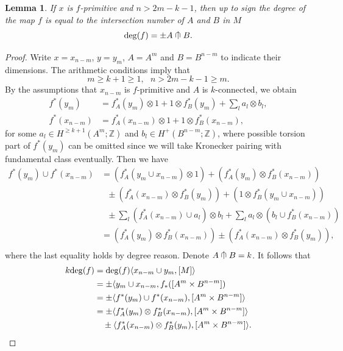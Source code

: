 \documentclass[a4]{amsart}
\newtheorem{lemma}[theorem]{Lemma}
\theoremstyle{definition}
\newcommand{\testcap}{\mathrel{\vcenter{\offinterlineskip
\hbox{$\cap$}\vskip-1.8ex\hbox{$\kern0.2em | \kern0.15em$}}}}
\begin{document}
\begin{sloppypar}
\begin{lemma}
If $x$ is $f$-primitive and $n>2m-k-1$, then up to sign the degree of the map $f$ is equal to the intersection number of $A$ and $B$ in $M$
\[
{\rm deg}(f)=\pm A\testcap B.
\]
\end{lemma}
\begin{proof}
Write $x=x_{n-m}$, $y=y_{m}$, $A=A^{m}$ and $B=B^{n-m}$ to indicate their dimensions. 
The arithmetic conditions imply that
\[
m\geq k+1\geq 1, \ \ \  n>2m-k-1\geq m.
\] 
By the assumptions that $x_{n-m}$ is $f$-primitive and $A$ is $k$-connected, we obtain 
\[\begin{split}
f^\ast(y_{m})&=f_A^\ast(y_{m})\otimes 1+ 1\otimes f_B^\ast(y_{m})+\sum\limits_{l}a_l\otimes b_l,\\
f^\ast(x_{n-m})&=f_A^\ast(x_{n-m})\otimes 1+1\otimes f_B^\ast(x_{n-m}),
\end{split}\]
for some $a_l\in H^{\geq k+1}(A^{m};\mathbb{Z})$ and $b_l\in H^{+}(B^{n-m};\mathbb{Z})$, where possible torsion part of $f^\ast(y_{m})$ can be omitted since we will take Kronecker pairing with fundamental class eventually. 
Then we have 
\[
\begin{split}
f^\ast(y_{m})\cup f^\ast(x_{n-m}) 
&= (f_A^\ast(y_{m}\cup x_{n-m})\otimes 1 ) + (f_A^\ast(y_{m})\otimes f_B^\ast(x_{n-m}))\\
&\ \ \ \pm (f_A^\ast(x_{n-m})\otimes f_B^\ast(y_{m}))+ (1\otimes f_B^\ast(y_{m}\cup x_{n-m}))\\
&\ \ \ \pm \sum\limits_{l}(f_A^\ast(x_{n-m})\cup a_l)\otimes b_l +\sum\limits_{l}a_l\otimes (b_l\cup f_B^\ast(x_{n-m}))\\ 
&=  (f_A^\ast(y_{m})\otimes f_B^\ast(x_{n-m})) \pm (f_A^\ast(x_{n-m})\otimes f_B^\ast(y_{m})),\\
\end{split}
\]
where the last equality holds by degree reason. 
Denote $A\testcap B=k$. It follows that 
\begin{equation}\label{kdegf1eq}
\begin{split}
k{\rm deg}(f)&= {\rm deg}(f) \langle x_{n-m}\cup y_{m}, [M]\rangle\\
 &=\pm\langle y_{m}\cup x_{n-m}, f_\ast ([A^{m}\times B^{n-m}])\\
&=\pm\langle f^\ast(y_{m})\cup f^\ast(x_{n-m}), [A^{m}\times B^{n-m}]\rangle \\
&=\pm \langle f_A^\ast(y_{m})\otimes f_B^\ast(x_{n-m}), [A^{m}\times B^{n-m}]\rangle \\
&\ \ \ \pm \langle f_A^\ast(x_{n-m})\otimes f_B^\ast(y_{m}), [A^{m}\times B^{n-m}]\rangle.
\end{split}

\end{equation}
\end{proof}
\end{sloppypar}
\end{document}
